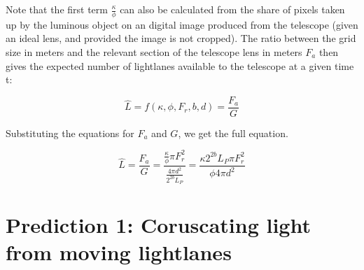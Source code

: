 \documentclass[notitlepage]{article}
\begin{document}
Note that the first term $\frac{\kappa }{\phi}$ can also be calculated from the share of pixels taken up by the luminous object on an digital image produced from the telescope (given an ideal lens, and provided the image is not cropped). 
The ratio between the grid size in meters and the relevant section of the telescope lens in meters $F_a$ then gives the expected number of lightlanes available to the telescope at a given time t:



\begin{equation}
\hat{L}  = f(\kappa, \phi, F_r, b, d) =\frac{ F_a }{G}  
 \label{eq:ExpectedGridCount}
\end{equation}


Substituting the equations for $F_a$ and $G$, we get the full equation.

\begin{equation}
\hat{L}  = \frac{ F_a }{G}  = \frac{ \frac{\kappa  }{\phi} \pi F_r^2 }{\frac{ 4\pi d^2}{ 2^{2b} L_P } }  =   \frac{ \kappa    2^{2b} L_P  \pi F_r^2 }{\phi 4\pi d^2 } 
 \label{eq:Grid}
\end{equation}



\section{Prediction 1: Coruscating light from moving lightlanes}
\end{document}
